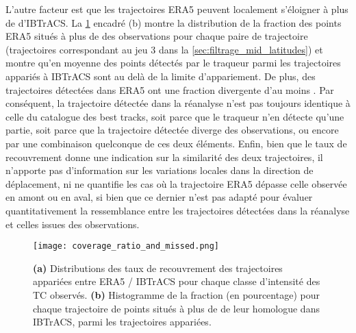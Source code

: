 \documentclass[../main.tex]{subfiles}
\begin{document}
L'autre facteur est que les trajectoires ERA5 peuvent localement s'éloigner à plus de  d'IBTrACS. La \cref{fig:coverage_ratio} encadré (b) montre la
distribution de la fraction des points ERA5 situés à plus de  des observations pour chaque paire de trajectoire (trajectoires correspondant au jeu 3
dans la \cref{sec:filtrage_mid_latitudes}) et montre qu'en moyenne  des points détectés par le traqueur parmi les trajectoires appariés à IBTrACS sont
au delà de la limite d'appariement. De plus,  des trajectoires détectées dans ERA5 ont une fraction divergente d'au moins . Par conséquent, la
trajectoire détectée dans la réanalyse n'est pas toujours identique à celle du catalogue des best tracks, soit parce que le traqueur n'en détecte qu'une partie,
soit parce que la trajectoire détectée diverge des observations, ou encore par une combinaison quelconque de ces deux éléments. Enfin, bien que le taux de
recouvrement donne une indication sur la similarité des deux trajectoires, il n'apporte pas d'information sur les variations locales dans la direction de
déplacement, ni ne quantifie les cas où la trajectoire ERA5 dépasse celle observée en amont ou en aval, si bien que ce dernier n'est pas adapté pour évaluer
quantitativement la ressemblance entre les trajectoires détectées dans la réanalyse et celles issues des observations.

\begin{figure}[tb]
    \centering
    \texttt{[image: coverage\_ratio\_and\_missed.png]}
    \caption{\textbf{(a)} Distributions des taux de recouvrement des trajectoires appariées entre ERA5 / IBTrACS pour chaque classe d'intensité des TC observés.
    \textbf{(b)} Histogramme de la fraction (en pourcentage) pour chaque trajectoire de points situés à plus de  de leur homologue dans IBTrACS, parmi
    les trajectoires appariées.}
    \label{fig:coverage_ratio}
\end{figure}
\end{document}
